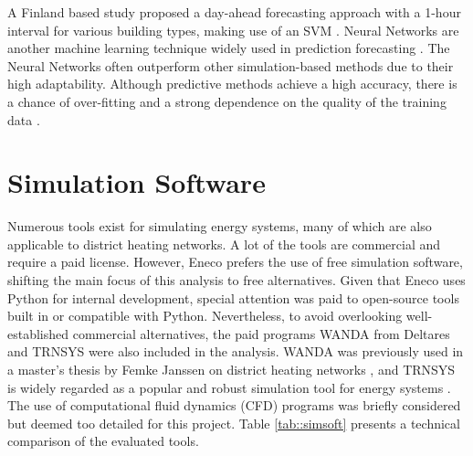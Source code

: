 A Finland based study proposed a day-ahead forecasting approach with a 1-hour interval for various building types, making use of an SVM \cite{SVMFinland}. Neural Networks are another machine learning technique widely used in prediction forecasting \cite{ZHANG199835,Hippert,FRISON2024132745}. The Neural Networks often outperform other simulation-based methods due to their high adaptability. Although predictive methods achieve a high accuracy, there is a chance of over-fitting and a strong dependence on the quality of the training data \cite{Talebi}.


\section{Simulation Software}
Numerous tools exist for simulating energy systems, many of which are also applicable to district heating networks. A lot of the tools are commercial and require a paid license. However, Eneco prefers the use of free simulation software, shifting the main focus of this analysis to free alternatives. Given that Eneco uses Python for internal development, special attention was paid to open-source tools built in or compatible with Python. Nevertheless, to avoid overlooking well-established commercial alternatives, the paid programs WANDA \cite{deltaresWanda} from Deltares and TRNSYS \cite{trnsys1975} were also included in the analysis. WANDA was previously used in a master’s thesis by Femke Janssen on district heating networks \cite{FemkeJanssenLit}, and TRNSYS is widely regarded as a popular and robust simulation tool for energy systems \cite{KUNTUAROVA}. The use of computational fluid dynamics (CFD) programs was briefly considered but deemed too detailed for this project. Table \ref{tab::simsoft} presents a technical comparison of the evaluated tools.

